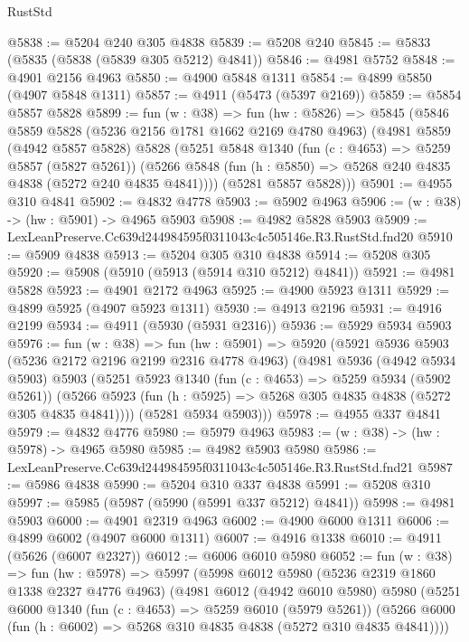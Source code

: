 \begin{lexlean}{RustStd}
\begin{coremodule}
@5838 := @5204 @240 @305 @4838
@5839 := @5208 @240
@5845 := @5833 (@5835 (@5838 (@5839 @305 @5212) @4841))
@5846 := @4981 @5752
@5848 := @4901 @2156 @4963
@5850 := @4900 @5848 @1311
@5854 := @4899 @5850 (@4907 @5848 @1311)
@5857 := @4911 (@5473 (@5397 @2169))
@5859 := @5854 @5857 @5828
@5899 := fun (w : @38) =>
  fun (hw : @5826) =>
  @5845
    (@5846
      @5859
      @5828
      (@5236 @2156 @1781 @1662 @2169 @4780 @4963)
      (@4981
        @5859
        (@4942 @5857 @5828)
        @5828
        (@5251
          @5848
          @1340
          (fun (c : @4653) => @5259 @5857 (@5827 @5261))
          (@5266 @5848 (fun (h : @5850) => @5268 @240 @4835 @4838 (@5272 @240 @4835 @4841))))
        (@5281 @5857 @5828)))
@5901 := @4955 @310 @4841
@5902 := @4832 @4778
@5903 := @5902 @4963
@5906 := (w : @38) -> (hw : @5901) -> @4965 @5903
@5908 := @4982 @5828 @5903
@5909 := LexLeanPreserve.Cc639d244984595f0311043c4c505146e.R3.RustStd.fnd20
@5910 := @5909 @4838
@5913 := @5204 @305 @310 @4838
@5914 := @5208 @305
@5920 := @5908 (@5910 (@5913 (@5914 @310 @5212) @4841))
@5921 := @4981 @5828
@5923 := @4901 @2172 @4963
@5925 := @4900 @5923 @1311
@5929 := @4899 @5925 (@4907 @5923 @1311)
@5930 := @4913 @2196
@5931 := @4916 @2199
@5934 := @4911 (@5930 (@5931 @2316))
@5936 := @5929 @5934 @5903
@5976 := fun (w : @38) =>
  fun (hw : @5901) =>
  @5920
    (@5921
      @5936
      @5903
      (@5236 @2172 @2196 @2199 @2316 @4778 @4963)
      (@4981
        @5936
        (@4942 @5934 @5903)
        @5903
        (@5251
          @5923
          @1340
          (fun (c : @4653) => @5259 @5934 (@5902 @5261))
          (@5266 @5923 (fun (h : @5925) => @5268 @305 @4835 @4838 (@5272 @305 @4835 @4841))))
        (@5281 @5934 @5903)))
@5978 := @4955 @337 @4841
@5979 := @4832 @4776
@5980 := @5979 @4963
@5983 := (w : @38) -> (hw : @5978) -> @4965 @5980
@5985 := @4982 @5903 @5980
@5986 := LexLeanPreserve.Cc639d244984595f0311043c4c505146e.R3.RustStd.fnd21
@5987 := @5986 @4838
@5990 := @5204 @310 @337 @4838
@5991 := @5208 @310
@5997 := @5985 (@5987 (@5990 (@5991 @337 @5212) @4841))
@5998 := @4981 @5903
@6000 := @4901 @2319 @4963
@6002 := @4900 @6000 @1311
@6006 := @4899 @6002 (@4907 @6000 @1311)
@6007 := @4916 @1338
@6010 := @4911 (@5626 (@6007 @2327))
@6012 := @6006 @6010 @5980
@6052 := fun (w : @38) =>
  fun (hw : @5978) =>
  @5997
    (@5998
      @6012
      @5980
      (@5236 @2319 @1860 @1338 @2327 @4776 @4963)
      (@4981
        @6012
        (@4942 @6010 @5980)
        @5980
        (@5251
          @6000
          @1340
          (fun (c : @4653) => @5259 @6010 (@5979 @5261))
          (@5266 @6000 (fun (h : @6002) => @5268 @310 @4835 @4838 (@5272 @310 @4835 @4841))))

\end{coremodule}
\end{lexlean}
